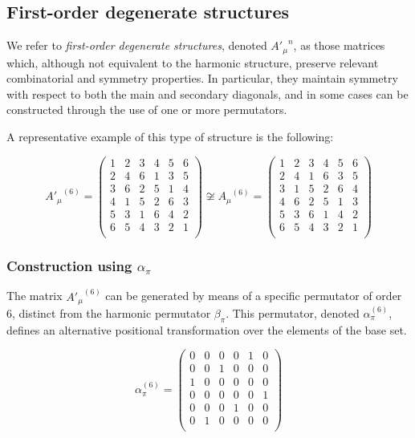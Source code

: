 \documentclass{article}
\begin{document}
\subsection{First-order degenerate structures}

We refer to \textit{first-order degenerate structures}, denoted \({A'_\mu}^{n}\), as those matrices which, although not equivalent to the harmonic structure, preserve relevant combinatorial and symmetry properties. In particular, they maintain symmetry with respect to both the main and secondary diagonals, and in some cases can be constructed through the use of one or more permutators.

A representative example of this type of structure is the following:


\begin{center}
\[
    {A'_\mu}^{(6)} =
\begin{pmatrix}
1 & 2 & 3 & 4 & 5 & 6 \\
2 & 4 & 6 & 1 & 3 & 5 \\
3 & 6 & 2 & 5 & 1 & 4 \\
4 & 1 & 5 & 2 & 6 & 3 \\
5 & 3 & 1 & 6 & 4 & 2 \\
6 & 5 & 4 & 3 & 2 & 1 \\
\end{pmatrix}
\not\cong
{A_\mu}^{(6)} =
\begin{pmatrix}
1 & 2 & 3 & 4 & 5 & 6 \\
2 & 4 & 1 & 6 & 3 & 5 \\
3 & 1 & 5 & 2 & 6 & 4 \\
4 & 6 & 2 & 5 & 1 & 3 \\
5 & 3 & 6 & 1 & 4 & 2 \\
6 & 5 & 4 & 3 & 2 & 1 \\
\end{pmatrix}
\]
\end{center}


\subsubsection{Construction using \(\alpha_\pi\)}

The matrix \({A'_\mu}^{(6)}\) can be generated by means of a specific permutator of order 6, distinct from the harmonic permutator \(\beta_\pi\). This permutator, denoted \(\alpha_\pi^{(6)}\), defines an alternative positional transformation over the elements of the base set.


\begin{center}
\[
\alpha_\pi^{(6)} =
\begin{pmatrix}
0 & 0 & 0 & 0 & 1 & 0 \\
0 & 0 & 1 & 0 & 0 & 0 \\
1 & 0 & 0 & 0 & 0 & 0 \\
0 & 0 & 0 & 0 & 0 & 1 \\
0 & 0 & 0 & 1 & 0 & 0 \\
0 & 1 & 0 & 0 & 0 & 0 \\
\end{pmatrix}
\]
\end{center}
\end{document}
